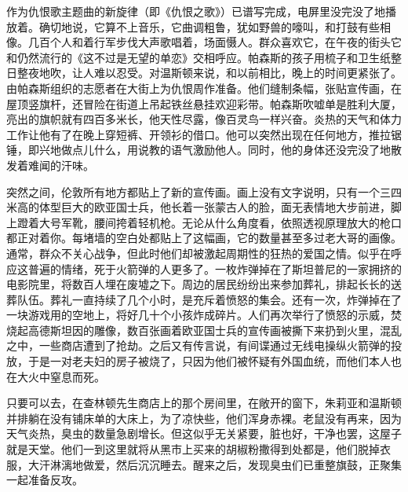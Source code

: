 作为仇恨歌主题曲的新旋律（即《仇恨之歌》）已谱写完成，电屏里没完没了地播放着。确切地说，它算不上音乐，它曲调粗鲁，犹如野兽的嚎叫，和打鼓有些相像。几百个人和着行军步伐大声歌唱着，场面慑人。群众喜欢它，在午夜的街头它和仍然流行的《这不过是无望的单恋》交相呼应。帕森斯的孩子用梳子和卫生纸整日整夜地吹，让人难以忍受。对温斯顿来说，和以前相比，晚上的时间更紧张了。由帕森斯组织的志愿者在大街上为仇恨周作准备。他们缝制条幅，张贴宣传画，在屋顶竖旗杆，还冒险在街道上吊起铁丝悬挂欢迎彩带。帕森斯吹嘘单是胜利大厦，亮出的旗帜就有四百多米长，他天性尽露，像百灵鸟一样兴奋。炎热的天气和体力工作让他有了在晚上穿短裤、开领衫的借口。他可以突然出现在任何地方，推拉锯锤，即兴地做点儿什么，用说教的语气激励他人。同时，他的身体还没完没了地散发着难闻的汗味。

突然之间，伦敦所有地方都贴上了新的宣传画。画上没有文字说明，只有一个三四米高的体型巨大的欧亚国士兵，他长着一张蒙古人的脸，面无表情地大步前进，脚上蹬着大号军靴，腰间挎着轻机枪。无论从什么角度看，依照透视原理放大的枪口都正对着你。每堵墙的空白处都贴上了这幅画，它的数量甚至多过老大哥的画像。通常，群众不关心战争，但此时他们却被激起周期性的狂热的爱国之情。似乎在呼应这普遍的情绪，死于火箭弹的人更多了。一枚炸弹掉在了斯坦普尼的一家拥挤的电影院里，将数百人埋在废墟之下。周边的居民纷纷出来参加葬礼，排起长长的送葬队伍。葬礼一直持续了几个小时，是充斥着愤怒的集会。还有一次，炸弹掉在了一块游戏用的空地上，将好几十个小孩炸成碎片。人们再次举行了愤怒的示威，焚烧起高德斯坦因的雕像，数百张画着欧亚国士兵的宣传画被撕下来扔到火里，混乱之中，一些商店遭到了抢劫。之后又有传言说，有间谍通过无线电操纵火箭弹的投放，于是一对老夫妇的房子被烧了，只因为他们被怀疑有外国血统，而他们本人也在大火中窒息而死。

只要可以去，在查林顿先生商店上的那个房间里，在敞开的窗下，朱莉亚和温斯顿并排躺在没有铺床单的大床上，为了凉快些，他们浑身赤裸。老鼠没有再来，因为天气炎热，臭虫的数量急剧增长。但这似乎无关紧要，脏也好，干净也罢，这屋子就是天堂。他们一到这里就将从黑市上买来的胡椒粉撒得到处都是，他们脱掉衣服，大汗淋漓地做爱，然后沉沉睡去。醒来之后，发现臭虫们已重整旗鼓，正聚集一起准备反攻。

